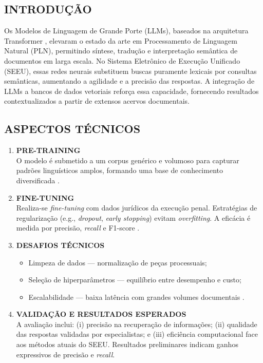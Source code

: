 \subsection*{INTRODUÇÃO}
Os Modelos de Linguagem de Grande Porte (LLMs), baseados na arquitetura
Transformer \cite{vaswani2017attention,naveeda2024comprehensive}, elevaram o
estado da arte em Processamento de Linguagem Natural (PLN), permitindo síntese,
tradução e interpretação semântica de documentos em larga escala. No Sistema
Eletrônico de Execução Unificado (SEEU), essas redes neurais substituem buscas
puramente lexicais por consultas semânticas, aumentando a agilidade e a
precisão das respostas. A integração de LLMs a bancos de dados vetoriais
\cite{taipalus2024vector,qwak2024integrating} reforça essa capacidade,
fornecendo resultados contextualizados a partir de extensos acervos
documentais.

\subsection*{ASPECTOS TÉCNICOS}
\begin{enumerate}[label=\textbf{2.\arabic*}, leftmargin=*]
  \item \textbf{PRE-TRAINING}\label{itm:pretraining}\\
        O modelo é submetido a um corpus genérico e volumoso para capturar
        padrões linguísticos amplos, formando uma base de conhecimento
        diversificada \cite{naveeda2024comprehensive}.
  
  \item \textbf{FINE-TUNING}\label{itm:finetuning}\\
        Realiza-se \emph{fine-tuning} com dados jurídicos da execução penal.
        Estratégias de regularização (e.g., \textit{dropout}, \textit{early
        stopping}) evitam \textit{overfitting}. A eficácia é medida por
        precisão, \textit{recall} e F1-score
        \cite{yue2023disclawllm,lai2023lawm}.
  
  \item \textbf{DESAFIOS TÉCNICOS}\label{itm:desafios}\\[-0.8em]
        \begin{itemize}
          \item Limpeza de dados — normalização de peças processuais;
          \item Seleção de hiperparâmetros — equilíbrio entre desempenho e custo;
          \item Escalabilidade — baixa latência com grandes volumes documentais
                \cite{edwards2024hybrid,pujiono2024implementing,aquino2024extracting}.
        \end{itemize}
  
  \item \textbf{VALIDAÇÃO E RESULTADOS ESPERADOS}\label{itm:validacao}\\
        A avaliação inclui: (i) precisão na recuperação de informações;
        (ii) qualidade das respostas validadas por especialistas; e
        (iii) eficiência computacional face aos métodos atuais do SEEU.
        Resultados preliminares indicam ganhos expressivos de precisão e
        \textit{recall}.
\end{enumerate}


